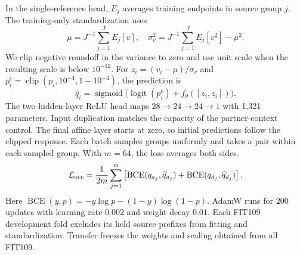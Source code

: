 In the single-reference head, \(E_j\) averages training endpoints in source group \(j\). The training-only standardization uses
\begin{equation}
\mu=J^{-1}\sum_{j=1}^{J}E_j[v],\quad
\sigma_v^2=J^{-1}\sum_{j=1}^{J}E_j[v^2]-\mu^2 .
\label{eq:group-standardization}
\end{equation}
We clip negative roundoff in the variance to zero and use unit scale when the resulting scale is below \(10^{-12}\). For \(z_i=(v_i-\mu)/\sigma_v\) and \(p_i^\epsilon=\operatorname{clip}(p_i,10^{-4},1-10^{-4})\), the prediction is
\begin{equation}
\widehat q_i=\operatorname{sigmoid}
 \big(\operatorname{logit}(p_i^\epsilon)+f_\theta([z_i,z_i])\big).
\label{eq:occupancy-head}
\end{equation}
The two-hidden-layer ReLU head maps \(28\to24\to24\to1\) with 1,321 parameters. Input duplication matches the capacity of the partner-context control. The final affine layer starts at zero, so initial predictions follow the clipped response. Each batch samples groups uniformly and takes a pair within each sampled group. With \(m=64\), the loss averages both sides.
\begin{equation}
\mathcal L_{\rm occ}=\frac{1}{2m}\sum_{j=1}^{m}
  \left[\operatorname{BCE}(q_{a_j},\widehat q_{a_j})+
        \operatorname{BCE}(q_{d_j},\widehat q_{d_j})\right].
\label{eq:occ-loss}
\end{equation}
Here \(\operatorname{BCE}(y,p)=-y\log p-(1-y)\log(1-p)\). AdamW runs for 200 updates with learning rate \(0.002\) and weight decay \(0.01\). Each FIT109 development fold excludes its held source prefixes from fitting and standardization. Transfer freezes the weights and scaling obtained from all FIT109.

